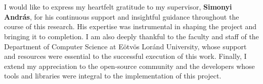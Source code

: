 \documentclass[
]{elteikthesis}[2024/04/26]
\begin{document}

\cleardoublepage


\cleardoublepage

% 

% 

% 

\chapter*{\acklabel}
I would like to express my heartfelt gratitude to my supervisor, \textbf{Simonyi András}, for his continuous support and insightful guidance throughout the course of this research. His expertise was instrumental in shaping the project and bringing it to completion.
I am also deeply thankful to the faculty and staff of the Department of Computer Science at Eötvös Loránd University, whose support and resources were essential to the successful execution of this work.
Finally, I extend my appreciation to the open-source community and the developers whose tools and libraries were integral to the implementation of this project.

% 

{}
\printbibliography[title=\biblabel]
\cleardoublepage

{}
\listoffigures
\cleardoublepage

{}
\listoftables
\cleardoublepage

 

\end{document}
